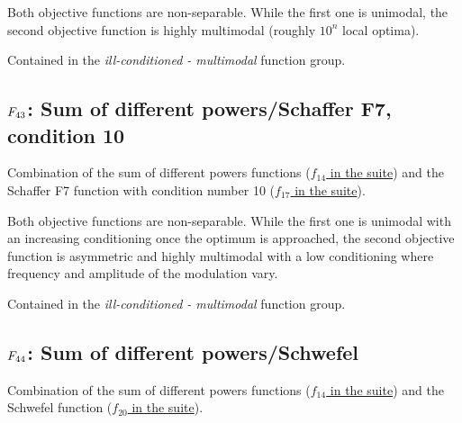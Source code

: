 Both objective functions are non-separable. While the first one
is unimodal, the second objective
function is highly multimodal (roughly \(10^n\) local optima).

Contained in the \emph{ill-conditioned - multimodal} function group.



\subsection[\texorpdfstring{\protect\(F_{43}\protect\): Sum of different powers/Schaffer F7, condition 10}{F43: Sum of different powers/Schaffer F7, condition 10}]{\texorpdfstring{\protect\(F_{43}\protect\): Sum of different powers/Schaffer F7, condition 10}{}}
\label{index:sum-of-different-powers-schaffer-f7-condition-10}\label{index:f43}
Combination of the sum of different powers functions
(\href{https://coco.gforge.inria.fr/downloads/download16.00/bbobdocfunctions.pdf\#page=70}{\(f_{14}\) in the \bbob suite}) and the Schaffer F7 function with
condition number 10 (\href{https://coco.gforge.inria.fr/downloads/download16.00/bbobdocfunctions.pdf\#page=85}{\(f_{17}\) in the \bbob suite}).

Both objective functions are non-separable. While the first one
is unimodal with an increasing conditioning once the optimum is approached,
the second objective function is asymmetric and highly multimodal with a
low conditioning where frequency and amplitude of the modulation vary.

Contained in the \emph{ill-conditioned - multimodal} function group.



\subsection[\texorpdfstring{\protect\(F_{44}\protect\): Sum of different powers/Schwefel}{F44: Sum of different powers/Schwefel}]{\texorpdfstring{\protect\(F_{44}\protect\): Sum of different powers/Schwefel}{}}
\label{index:f44}\label{index:sum-of-different-powers-schwefel}
Combination of the sum of different powers functions
(\href{https://coco.gforge.inria.fr/downloads/download16.00/bbobdocfunctions.pdf\#page=70}{\(f_{14}\) in the \bbob suite}) and the Schwefel function (\href{https://coco.gforge.inria.fr/downloads/download16.00/bbobdocfunctions.pdf\#page=100}{\(f_{20}\) in the \bbob suite}).

